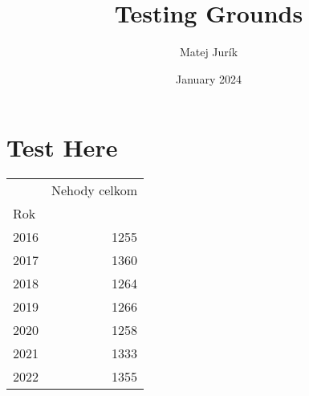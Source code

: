 \documentclass{article}
\title{Testing Grounds}
\author{Matej Jurík}
\date{January 2024}
\begin{document}
\maketitle

\section{Test Here}



\begin{tabular}{lr}
\toprule
 & Nehody celkom \\
Rok &  \\
\midrule
2016 & 1255 \\
2017 & 1360 \\
2018 & 1264 \\
2019 & 1266 \\
2020 & 1258 \\
2021 & 1333 \\
2022 & 1355 \\
\bottomrule
\end{tabular}
\end{document}

